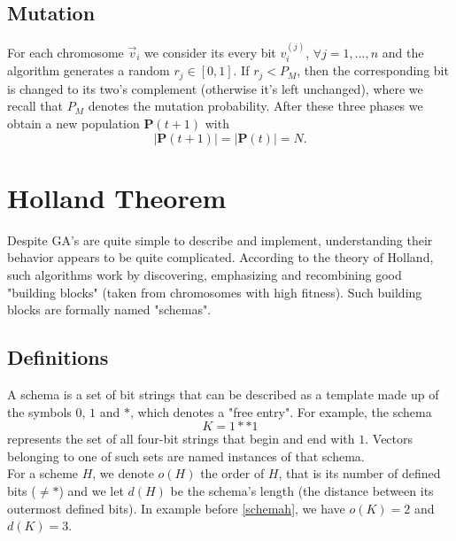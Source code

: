 \documentclass[%
    corpo=11pt,
    twoside,
    stile=classica,
    oldstyle,
    autoretitolo,
    tipotesi=magistrale,
    greek,
    evenboxes,
    english
]{toptesi}
\begin{document}
\subsection{Mutation}
For each chromosome $\vec{v}_i$ we consider its every bit $v_i^{(j)}$, $\forall j=1,\dots,n$ and the algorithm generates a random $r_j \in \left[0,1\right]$.
If $r_j < P_M$, then the corresponding bit is changed to its two's complement (otherwise it's left unchanged), where we recall that $P_M$ denotes the mutation probability. After these three phases we obtain a new population $\textbf{P}(t+1)$ with 
\begin{equation}
|\textbf{P}(t+1)|=|\textbf{P}(t)|=N.
\end{equation}
\newpage

\section{Holland Theorem}
Despite GA's are quite simple to describe and implement, understanding their behavior appears to be quite complicated. According to the theory of Holland, such algorithms work by discovering, emphasizing and recombining good "building blocks" (taken from chromosomes with high fitness). Such building blocks are formally named "schemas". 
\subsection{Definitions}
A schema is a set of bit strings that can be described as a template made up of the symbols $0$, $1$ and $*$, which denotes a "free entry". For example, the schema
\begin{equation}
\label{schemah}
K = 1**1
\end{equation}
represents the set of all four-bit strings that begin and end with $1$. Vectors belonging to one of such sets are named instances of that schema. \\
For a scheme $H$, we denote $o(H)$ the order of $H$, that is its number of defined bits ($\neq *$) and we let $d(H)$ be the schema's length (the distance between its outermost defined bits). In example before \eqref{schemah}, we have $o(K)=2$ and $d(K)=3$.
\end{document}

